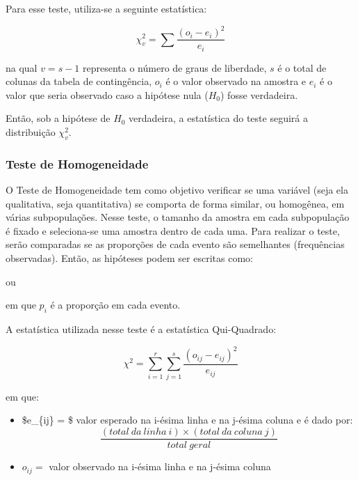 \documentclass[
]{estat/estat}
\begin{document}
Para esse teste, utiliza-se a seguinte estatística:

\[ \chi_{v}^{2} = \sum \frac{(o_{i} - e_{i})^{2}}{e_{i}} \]

na qual \(v = s - 1\) representa o número de graus de liberdade, \(s\) é
o total de colunas da tabela de contingência, \(o_{i}\) é o valor
observado na amostra e \(e_{i}\) é o valor que seria observado caso a
hipótese nula (\(H_0\)) fosse verdadeira.

Então, sob a hipótese de \(H_{0}\) verdadeira, a estatística do teste
seguirá a distribuição \(\chi_{v}^{2}\).

\hypertarget{teste-de-homogeneidade}{%
\subsubsection{Teste de Homogeneidade}\label{teste-de-homogeneidade}}

O Teste de Homogeneidade tem como objetivo verificar se uma variável
(seja ela qualitativa, seja quantitativa) se comporta de forma similar,
ou homogênea, em várias subpopulações. Nesse teste, o tamanho da amostra
em cada subpopulação é fixado e seleciona-se uma amostra dentro de cada
uma. Para realizar o teste, serão comparadas se as proporções de cada
evento são semelhantes (frequências observadas). Então, as hipóteses
podem ser escritas como:


ou


em que \(p_{i}\) é a proporção em cada evento.

A estatística utilizada nesse teste é a estatística Qui-Quadrado:

\[ \chi^{2} = \displaystyle\sum_{i=1}^r \sum_{j=1}^s \frac{ {(o_{ij} - e_{ij})}^2}{e_{ij}} \]

em que:

\begin{itemize}
\item
  \$e\_\{ij\} = \$ valor esperado na i-ésima linha e na j-ésima coluna e
  é dado por:
  \[ \frac{(total\ da\ linha\ i) \times (total\ da\ coluna\ j)}{total\ geral} \]
\item
  \(o_{ij} =\) valor observado na i-ésima linha e na j-ésima coluna
\end{itemize}
\end{document}
